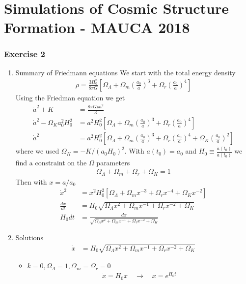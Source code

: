 \documentclass[10pt,a4paper]{article}
\theoremstyle{definition}
\begin{document}
\newpage
\section{Simulations of Cosmic Structure Formation - MAUCA 2018}
\subsubsection{Exercise 2}
\begin{enumerate}
\item Summary of Friedmann equations
We start with the total energy density
\begin{align}
\rho=\frac{3H_0^2}{8\pi G}\left[
\Omega_\Lambda+
\Omega_m\left(\frac{a_0}{a}\right)^3+
\Omega_r\left(\frac{a_0}{a}\right)^4\right]
\end{align}
Using the Friedman equation we get
\begin{align}
\dot{a}^2+K
&=\frac{8\pi G\rho a^2}{3}\\
\dot{a}^2-\Omega_Ka_0^2H_0^2&=a^2H_0^2\left[
\Omega_\Lambda+
\Omega_m\left(\frac{a_0}{a}\right)^3+
\Omega_r\left(\frac{a_0}{a}\right)^4\right]\\
\dot{a}^2&=a^2H_0^2\left[
\Omega_\Lambda+
\Omega_m\left(\frac{a_0}{a}\right)^3+
\Omega_r\left(\frac{a_0}{a}\right)^4+
\Omega_K\left(\frac{a_0}{a}\right)^2\right]
\end{align}
where we used $\Omega_K=-K/(a_0H_0)^2$. With $a(t_0)=a_0$ and $H_0\equiv\frac{\dot{a}(t_0)}{a(t_0)}$ we find a constraint on the $\Omega$ parameters
\begin{align}
\Omega_\Lambda+\Omega_m+\Omega_r+\Omega_K=1
\end{align}
Then with $x=a/a_0$
\begin{align}
\dot{x}^2&=x^2H_0^2\left[
\Omega_\Lambda+
\Omega_m x^{-3}+
\Omega_r x^{-4}+
\Omega_K x^{-2}\right]\\
\frac{dx}{dt}&=H_0\sqrt{
\Omega_\Lambda x^2+
\Omega_m x^{-1}+
\Omega_r x^{-2}+
\Omega_K}\\
H_0dt&=
\frac{dx}{\sqrt{
\Omega_\Lambda x^2+
\Omega_m x^{-1}+
\Omega_r x^{-2}+
\Omega_K}}
\end{align}
\item Solutions
\begin{align}
\dot{x}&=H_0\sqrt{
\Omega_\Lambda x^2+
\Omega_m x^{-1}+
\Omega_r x^{-2}+
\Omega_K}
\end{align}
\begin{itemize}
\item $k=0, \Omega_\Lambda=1,\Omega_m=\Omega_r=0$
\begin{align}
\dot{x}=H_0x\quad\rightarrow\quad x=e^{H_0t}
\end{align}


\end{itemize}
\end{enumerate}
\end{document}
